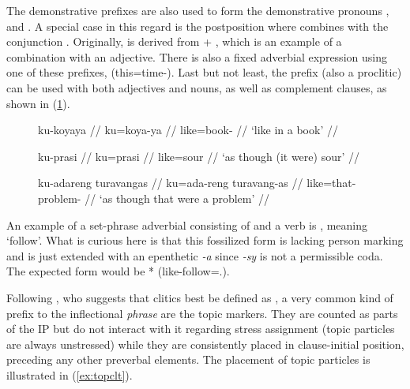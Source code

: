 The demonstrative prefixes are also used to form the demonstrative 
pronouns , 
 and . A special case
in this regard is the postposition  where  combines with the conjunction
. Originally, 
 is derived from  + 
, which is an example of a combination 
with an adjective. There is also a fixed adverbial expression using one of
these prefixes, 
(this=time-\Dat{}). Last but not least, the prefix  (also a proclitic) can be used with both adjectives and nouns, as well
as complement clauses, as shown in (\ref{ex:kucombin}).

\begin{figure}
\pex\label{ex:kucombin}
\a\begingl
	\gla ku-koyaya //
	\glb ku=koya-ya //
	\glc like=book-\Loc{} //
	\glft `like in a book' //
\endgl

\a\begingl
	\gla ku-prasi //
	\glb ku=prasi //
	\glc like=sour //
	\glft `as though (it were) sour' //
\endgl

\a\begingl
	\gla ku-adareng turavangas //
	\glb ku=ada-reng turavang-as //
	\glc like=that-\AargI{} problem-\Parg{} //
	\glft `as though that were a problem' //
\endgl
\xe
\end{figure}

An example of a set-phrase adverbial consisting of  and a verb 
is ,  meaning `follow'. 
What is curious here is that this fossilized form is lacking person marking 
and is just extended with an epenthetic \textit{-a} since \textit{-sy} is not 
a permissible coda. The expected form would be 
* (like-follow=\TsgI{}.\Aarg{}).

Following \citet{klavans1985}, who suggests that clitics best be defined as
, a very common
kind of prefix to the inflectional \emph{phrase} are the topic markers. They
are counted as parts of the IP but do not interact with it regarding stress
assignment (topic particles are always unstressed) while they are consistently
placed in clause-initial position, preceding any other preverbal elements. The
placement of topic particles is illustrated in (\ref{ex:topclt}).

